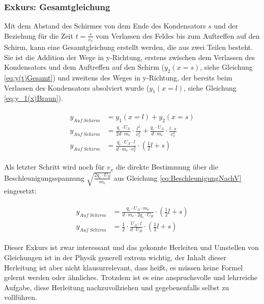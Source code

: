 \subsubsection{Exkurs: Gesamtgleichung}

\noindent Mit dem Abstand des Schirmes von dem Ende des Kondensators $s$ und der Beziehung für die Zeit $t=\frac{s}{v_x}$ vom Verlassen des Feldes bis zum Auftreffen auf den Schirm, kann eine Gesamtgleichung erstellt werden, die aus zwei Teilen besteht. Sie ist die Addition der Wege in y-Richtung, erstens zwischen dem Verlassen des Kondensators und dem Auftreffen auf den Schirm ($y_2(x=s)$, siehe Gleichung \ref{eq:y(t)Gesamt}) und zweitens des Weges in y-Richtung, der bereits beim Verlassen des Kondensators absolviert wurde ($y_1(x=l)$, siehe Gleichung \ref{eq:y_1(x)Braun}).

\begin{align} \label{eq:yGesamtAnsatz}
\begin{split}
	y_{Auf \ Schirm} &= y_1(x=l) + y_2(x=s) \\
	y_{Auf \ Schirm} &= \frac{q_e \cdot U_A}{2d \cdot m_e} \cdot \frac{l^2}{v_{x}^2}
				      + \frac{q_e \cdot U_A}{d \cdot m_e} \cdot \frac{l \cdot s}{v_{x}^2} \\
	y_{Auf \ Schirm} &= \frac{q_e \cdot U_A \cdot l}{d \cdot m_e \cdot v_{x}^2} \cdot (\frac{1}{2}l + s)
\end{split}
\end{align}

Als letzter Schritt wird noch für $v_{x}$ die direkte Bestimmung über die Beschleunigungsspannung $\sqrt{\frac{2 q_e \cdot U_B}{m_e}}$ aus Gleichung \ref{eq:BeschleunigungNachV} eingesetzt:

\begin{align} \label{eq:yGesamt}
\begin{split}
	y_{Auf \ Schirm} &= \frac{q_e \cdot U_A \cdot m_e}{d \cdot m_e \cdot 2 q_e \cdot U_B} \cdot (\frac{1}{2}l + s) \\
	y_{Auf \ Schirm} &= \frac{1}{2} \cdot \frac{U_A \cdot l}{d \cdot U_B} \cdot (\frac{1}{2}l + s)
\end{split}
\end{align}

\begin{Anmerkung}
Dieser Exkurs ist zwar interessant und das gekonnte Herleiten und Umstellen von Gleichungen ist in der Physik generell extrem wichtig, der Inhalt dieser Herleitung ist aber nicht klausurrelevant, dass heißt, es müssen keine Formel gelernt werden oder ähnliches. Trotzdem ist es eine anspruchsvolle und lehrreiche Aufgabe, diese Herleitung nachzuvollziehen und gegebenenfalls selbst zu vollführen.
\end{Anmerkung}




